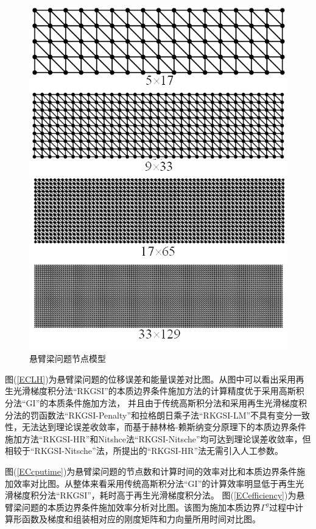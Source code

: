 \begin{figure}[H]
    \centering
    \includegraphics[scale=0.8]{figure/EHR/cantilever/cantilever.mesh.png}
    \caption{悬臂梁问题节点模型}\label{cantilever.mesh}
\end{figure}
图(\ref{ECLH})为悬臂梁问题的位移误差和能量误差对比图。从图中可以看出采用再生光滑梯度积分法“RKGSI”的本质边界条件施加方法的计算精度优于采用高斯积分法“GI”的本质条件施加方法，
并且由于传统高斯积分法和采用再生光滑梯度积分法的罚函数法“RKGSI-Penalty”和拉格朗日乘子法“RKGSI-LM”不具有变分一致性，无法达到理论误差收敛率，而基于赫林格-赖斯纳变分原理下的本质边界条件施加方法“RKGSI-HR”和Nitshce法“RKGSI-Nitsche”均可达到理论误差收敛率，但相较于“RKGSI-Nitsche”法，所提出的“RKGSI-HR”法无需引入人工参数。
\par
图(\ref{ECcputime})为悬臂梁问题的节点数和计算时间的效率对比和本质边界条件施加效率对比图。从整体来看采用传统高斯积分法“GI”的计算效率明显低于再生光滑梯度积分法“RKGSI”，耗时高于再生光滑梯度积分法。
图(\ref{ECefficiency})为悬臂梁问题的本质边界条件施加效率分析对比图。该图为施加本质边界$\Gamma^g$过程中计算形函数及梯度和组装相对应的刚度矩阵和力向量所用时间对比图。
